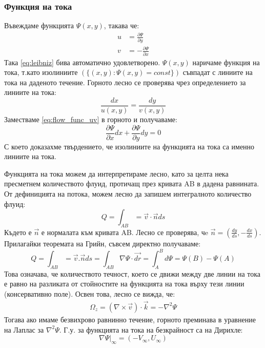 \subsubsection{Функция на тока}
Въвеждаме функцията $\Psi(x,y)$, такава че:
\begin{align}
	\label{eq:flow_func_uv}
	u & = \frac{\partial \Psi}{\partial y}            \\
	v & = -\frac{\partial \Psi}{\partial x} \nonumber
\end{align}
Така \autoref{eq:leibniz} бива автоматично удовлетворено. $\Psi(x,y)$ наричаме функция на тока, т.като изолиниите $\left(\{(x,y): \Psi(x,y) = const\}\right)$ съвпадат с линиите на тока на даденото течение.
Горното лесно се проверява чрез определението за линиите на тока:
\begin{equation*}
	\frac{dx}{u(x,y)} = \frac{dy}{v(x,y)}
\end{equation*}
Заместваме \autoref{eq:flow_func_uv} в горното и получаваме:
\begin{equation*}
	\frac{\partial \Psi}{\partial x} d x + \frac{\partial \Psi}{\partial y} d y = 0
\end{equation*}
С което доказахме твърдението, че изолиниите на функцията на тока са именно линиите на тока.

Функцията на тока можем да интерпретираме лесно, като за целта нека пресметнем количеството флуид, протичащ през кривата AB в дадена равнината. От дефиницията на потока, можем лесно да запишем интегралното количество флуид:
\begin{equation*}
	Q = \int_{AB} = \vec{v} \cdot \vec{n} ds
\end{equation*}
Където е $\vec{n}$ е нормалата към кривата AB. Лесно се проверява, чe $\vec{n} = (\frac{dy}{ds}, -\frac{d x}{d s})$. Прилагайки теоремата на Грийн, съвсем директно получаваме:
\begin{equation}
	Q = \int_{AB} = \vec{v}.\vec{n} ds = \int_{AB} \nabla \Psi \cdot \vec{dr} = \int_{A}^{B} d \Psi = \Psi(B) - \Psi(A)
\end{equation}
Това означава, че количеството течност, което се движи между две линии на тока е равно на разликата от стойностите на функцията на тока върху тези линии (консервативно поле).
Освен това, лесно се вижда, че:
\begin{align*}
	\Omega_z = (\nabla \times \vec{v}) \cdot \vec{k} = - \nabla^2 \Psi
\end{align*}
Тогава ако имаме безвихрово равнинно течение, горното преминава в уравнение на Лаплас за $\nabla^2 \Psi$.
Г.у. за функцията на тока на безкрайност са на Дирихле:
\begin{equation*}
	\nabla \Psi \big|_\infty = (-V_\infty, U_\infty)
\end{equation*}

